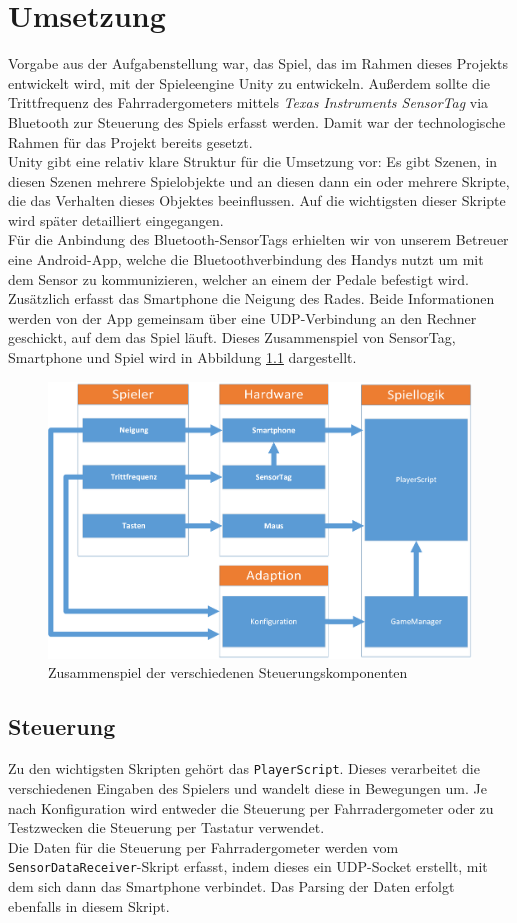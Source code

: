 \chapter{Umsetzung}
Vorgabe aus der Aufgabenstellung war, das Spiel, das im Rahmen dieses Projekts entwickelt wird, mit der Spieleengine Unity zu entwickeln. Außerdem sollte die Trittfrequenz des Fahrradergometers mittels \textit{Texas Instruments SensorTag} via Bluetooth zur Steuerung des Spiels erfasst werden. Damit war der technologische Rahmen für das Projekt bereits gesetzt.\\
Unity gibt eine relativ klare Struktur für die Umsetzung vor: Es gibt Szenen, in diesen Szenen mehrere Spielobjekte und an diesen dann ein oder mehrere Skripte, die das Verhalten dieses Objektes beeinflussen. Auf die wichtigsten dieser Skripte wird später detailliert eingegangen.\\
Für die Anbindung des Bluetooth-SensorTags erhielten wir von unserem Betreuer eine Android-App, welche die Bluetoothverbindung des Handys nutzt um mit dem Sensor zu kommunizieren, welcher an einem der Pedale befestigt wird. Zusätzlich erfasst das Smartphone die Neigung des Rades. Beide Informationen werden von der App gemeinsam über eine UDP-Verbindung an den Rechner geschickt, auf dem das Spiel läuft. Dieses Zusammenspiel von SensorTag, Smartphone und Spiel wird in Abbildung \ref{Steuerung} dargestellt.\\
\begin{figure}[ht]
\centering
\includegraphics[width=.7\textwidth]{gfx/Steuerung.png}
\caption{Zusammenspiel der verschiedenen Steuerungskomponenten}
\label{Steuerung}
\end{figure}
\section{Steuerung}
Zu den wichtigsten Skripten gehört das \texttt{PlayerScript}. Dieses verarbeitet die verschiedenen Eingaben des Spielers und wandelt diese in Bewegungen um. Je nach Konfiguration wird entweder die Steuerung per Fahrradergometer oder zu Testzwecken die Steuerung per Tastatur verwendet.\\
Die Daten für die Steuerung per Fahrradergometer werden vom \texttt{SensorDataReceiver}-Skript erfasst, indem dieses ein UDP-Socket erstellt, mit dem sich dann das Smartphone verbindet. Das Parsing der Daten erfolgt ebenfalls in diesem Skript.
